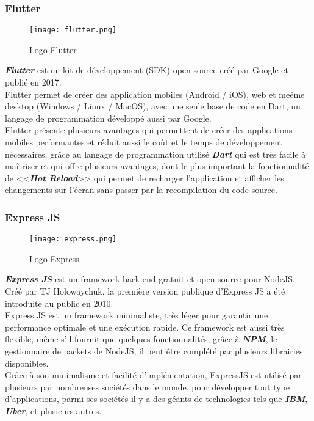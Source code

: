 \subsubsection{Flutter}
\vspace{1cm}
\begin{figure}[H]
    \centering
    \texttt{[image: flutter.png]}
    \vspace{1cm}
    \caption{Logo Flutter}
    \label{fig:flutter_logo}
\end{figure}
\textit{\textbf{Flutter}} est un kit de développement (SDK) open-source créé par Google et publié en 2017.\\
\noindent Flutter permet de créer des application mobiles (Android / iOS), web et meême desktop (Windows / Linux / MacOS), avec une seule base de code en Dart, un langage de programmation développé aussi par Google. \\
\noindent Flutter présente plusieurs avantages qui permettent de créer des applications mobiles performantes et réduit aussi le coût et le temps de développement nécessaires, grâce au langage de programmation utilisé \textit{\textbf{Dart}} qui est très facile à maîtriser et qui offre plusieurs avantages, dont le plus important la fonctionnalité de <<\textit{\textbf{Hot Reload}}>> qui permet de recharger l'application et afficher les changements sur l'écran sans passer par la recompilation du code source.
\subsubsection{Express JS}
\vspace{1cm}
\begin{figure}[H]
    \centering
    \texttt{[image: express.png]}
    \vspace{1cm}
    \caption{Logo Express}
    \label{fig:express_logo}
\end{figure}
\textit{\textbf{Express JS}} est un framework back-end gratuit et open-source pour NodeJS. Créé par TJ Holowaychuk, la première version publique d'Express JS a été introduite au public en 2010.\\
Express JS est un framework minimaliste, très léger pour garantir une performance optimale et une exécution rapide. Ce framework est aussi très flexible, même s'il fournit que quelques fonctionnalités, grâce à \textit{\textbf{NPM}}, le gestionnaire de packets de NodeJS, il peut être complété par plusieurs librairies disponibles.\\
\noindent Grâce à son minimalisme et facilité d'implémentation, ExpressJS est utilisé par plusieurs par nombreuses sociétés dans le monde, pour développer tout type d'applications, parmi ses sociétés il y a des géants de technologies tels que \textit{\textbf{IBM}}, \textit{\textbf{Uber}}, et plusieurs autres.
